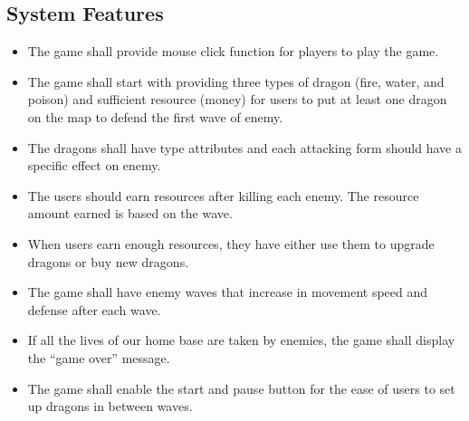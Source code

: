 \documentclass{article}
\begin{document}
\subsection{System Features}
\begin{itemize}
    \item The game shall provide mouse click function for players to play the game.
    \item The game shall start with providing three types of dragon (fire, water, and poison) and sufficient resource (money) for users to put at least one dragon on the map to defend the first wave of enemy.
    \item The dragons shall have type attributes and each attacking form should have a specific effect on enemy.
    \item The users should earn resources after killing each enemy. The resource amount earned is based on the wave.
    \item When users earn enough resources, they have either use them to upgrade dragons or buy new dragons.
    \item The game shall have enemy waves that increase in movement speed and defense after each wave.
    \item If all the lives of our home base are taken by enemies, the game shall display the “game over” message.
    \item The game shall enable the start and pause button for the ease of users to set up dragons in between waves.
\end{itemize}

\newpage
\end{document}
